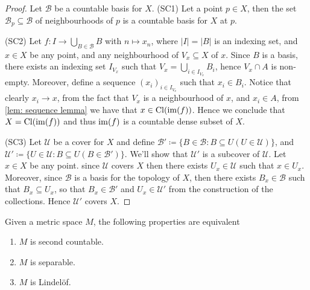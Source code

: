 \begin{proof}
Let \(\mathcal B\) be a countable basis for \(X\).
(SC1) Let a point \(p \in X\), then the set \(\mathcal B_p \subseteq \mathcal
B\) of neighbourhoods of \(p\) is a countable basis for \(X\) at \(p\).

(SC2) Let \(f: I \to \bigcup_{B \in \mathcal B} B\) with \(n \mapsto x_n\),
where \(|I| = |B|\) is an indexing set, and \(x \in X\) be any point, and any
neighbourhood of \(V_x \subseteq X\) of \(x\). Since \(B\) is a basis, there
exists an indexing set \(I_{V_x}\) such that \(V_x = \bigcup_{i \in  I_{V_x}}
B_i\), hence \(V_x \cap A\) is non-empty. Moreover, define a sequence
\((x_i)_{i \in I_{V_x}}\) such that \(x_i \in B_i\). Notice that clearly \(x_i
\to x\), from the fact that \(V_x\) is a neighbourhood of \(x\), and \(x_i \in
A\), from \cref{lem: sequence lemma} we have that \(x \in \operatorname{Cl}(\operatorname{im}(f))\).
Hence we conclude that \(X = \operatorname{Cl}(\operatorname{im}(f))\) and thus \(\operatorname{im}(f)\) is a
countable dense subset of \(X\).

(SC3) Let \(\mathcal U\) be a cover for \(X\) and define \(\mathcal B' \coloneq
\{B \in \mathcal B \colon B \subseteq U (U \in \mathcal U)\}\), and \(\mathcal
U' \coloneq \{U \in \mathcal U \colon B \subseteq U (B \in \mathcal
B')\}\). We'll show that \(\mathcal U'\) is a subcover of \(\mathcal U\). Let
\(x \in X\) be any point.  since \(\mathcal U\) covers \(X\) then there exists
\(U_x \in \mathcal U\) such that \(x \in U_x\). Moreover, since \(\mathcal B\)
is a basis for the topology of \(X\), then there exists \(B_x \in \mathcal B\)
such that \(B_x \subseteq U_x\), so that \(B_x \in \mathcal B'\) and \(U_x \in
\mathcal U'\) from the construction of the collections. Hence \(\mathcal U'\)
covers \(X\).
\end{proof}

\begin{proposition}\label{prop: metric space properties}
Given a metric space \(M\), the following properties are equivalent
\begin{enumerate}[(MS1)]
\item \(M\) is second countable.
\item \(M\) is separable.
\item \(M\) is Lindelöf.
\end{enumerate}
\end{proposition}

